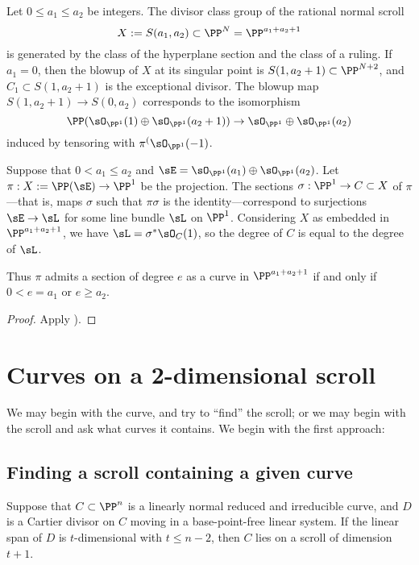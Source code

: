 \begin{corollary}\cite[****]{Hartshorne1977}
Let $0\leq a_1\leq a_2$ be integers. The divisor class group of the 
rational normal scroll 
$$
X:=S(a_1,a_2) \subset \PP^N = \PP^{a_1+a_2+1}
$$
is generated by the class of the hyperplane section and the class
of a ruling. If $a_1 = 0$, then the blowup of $X$ at its singular point is $S(1, a_2+1)\subset \PP^{N+2}$,
and $C_1\subset S(1, a_2+1)$ is the exceptional divisor. The blowup map $S(1, a_2+1) \to S(0,a_2)$
corresponds to the isomorphism 
$$
\PP(\sO_{\PP^1}(1) \oplus \sO_{\PP^1}(a_2+1)) \to \sO_{\PP^1} \oplus \sO_{\PP^1}(a_2)
$$
induced by tensoring with $\pi^(\sO_{\PP^1}(-1)$.
\end{corollary}

\begin{proposition} Suppose that $0<a_1\leq a_2$ and
$\sE = \sO_{\PP^1}(a_1)\oplus \sO_{\PP^1}(a_2)$. Let $\pi: X:= \PP(\sE) \to \PP^1$ be the projection.
The sections $\sigma:\PP^1 \to C\subset X$ of $\pi$---that is, maps $\sigma$ such that $\pi\sigma$ is the 
identity---correspond to surjections
$\sE \to \sL$ for some line bundle $\sL$ on $\PP^1$. Considering  $X$ as embedded in 
$\PP^{a_1+a_2+1}$, we have $\sL = \sigma^*\sO_C(1)$, so the degree of $C$ is equal
to the degree of $\sL$.

Thus $\pi$ admits a section of degree $e$ as a curve in $\PP^{a_1+a_2+1}$ if and only if
$0<e = a_1$ or $e\geq a_2$.
\end{proposition}

\begin{proof}
Apply \cite[II.7.12]{Hartshorne1977}).
\end{proof}



\section{Curves on a 2-dimensional scroll}\label{curves on scrolls}

We may begin with the curve, and try to ``find'' the scroll; or we may begin with the scroll and ask
what curves it contains. We begin with the first approach:


\subsection{Finding a scroll containing a given curve}

\begin{proposition}
Suppose that $C\subset \PP^n$ is a linearly normal reduced and irreducible curve, and $D$ is a  Cartier divisor on $C$ moving in a base-point-free linear system. If the linear span of $D$ is $t$-dimensional with $t\leq n-2$, then $C$ lies on a scroll of dimension $t+1$.
\end{proposition}

